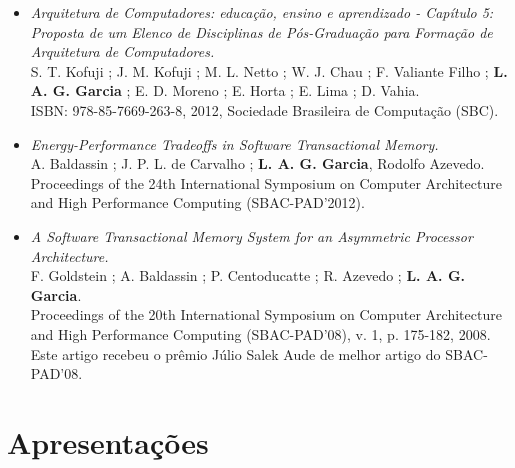 \documentclass[10pt]{article} %
\begin{document}
\begin{itemize}
 \item \textit{Arquitetura de Computadores: educação, ensino e aprendizado - Capítulo 5: Proposta de um Elenco de Disciplinas de Pós-Graduação para Formação de Arquitetura de Computadores.} \\
  S. T. Kofuji ; J. M. Kofuji ; M. L. Netto ; W. J. Chau ; F. Valiante Filho ; \textbf{L. A. G. Garcia} ; E. D. Moreno ; E. Horta ; E. Lima ; D. Vahia.  \\
  ISBN: 978-85-7669-263-8, 2012, Sociedade Brasileira de Computação (SBC).
 \item \textit{Energy-Performance Tradeoffs in Software Transactional Memory.} \\
  A. Baldassin ; J. P. L. de Carvalho ; \textbf{L. A. G. Garcia}, Rodolfo Azevedo. \\
  Proceedings of the 24th International Symposium on Computer Architecture and High Performance Computing (SBAC-PAD'2012).  
 \item \textit{A Software Transactional Memory System for an Asymmetric Processor Architecture.} \\
  F. Goldstein ; A. Baldassin ; P. Centoducatte ; R. Azevedo ; \textbf{L. A. G. Garcia}. \\
  Proceedings of the 20th International Symposium on Computer Architecture and High Performance Computing (SBAC-PAD'08), v. 1, p. 175-182, 2008. \\
  Este artigo recebeu o prêmio Júlio Salek Aude de melhor artigo do SBAC-PAD'08.
\end{itemize}


\section{Apresentações}
\end{document}
